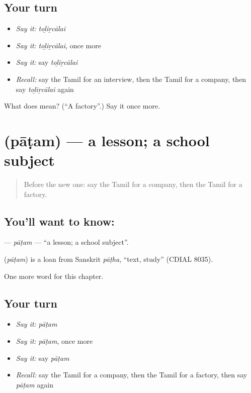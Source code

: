 \subsection*{Your turn}
\begin{itemize}
\raggedright
  \item \emph{Say it:} \emph{toḻiṟcālai}
  \item \emph{Say it:} \emph{toḻiṟcālai}, once more
  \item \emph{Say it:} say \emph{toḻiṟcālai}
  \item \emph{Recall:} say the Tamil for an interview, then the Tamil for a company, then say \emph{toḻiṟcālai} again
\end{itemize}

\begin{tcolorbox}[breakable,colback=teal!4,colframe=teal!35!black,title={Before you move on}]
What does  mean? (\textquotedblleft{}A factory\textquotedblright{}.) Say it once more.
\end{tcolorbox}
\section[\texorpdfstring{\ta{பாடம்} (pāṭam)}{பாடம் (pāṭam)}]{ (pāṭam) — a lesson; a school subject}

\label{lesson:TA-C223-patam}



\begin{quote}
Before the new one: say the Tamil for a company, then the Tamil for a factory.
\end{quote}

\subsection*{You'll want to know: }
\textbf{} — \emph{pāṭam} — \textquotedblleft{}a lesson; a school subject\textquotedblright{}.

\begin{cousinweb}
\textbf{} (\emph{pāṭam}) is a loan from Sanskrit \emph{pāṭha}, \textquotedblleft{}text, study\textquotedblright{} (CDIAL 8035).
\end{cousinweb}

\begin{grammarlens}[title={What you've built}]
One more word for this chapter.
\end{grammarlens}

\subsection*{Your turn}
\begin{itemize}
\raggedright
  \item \emph{Say it:} \emph{pāṭam}
  \item \emph{Say it:} \emph{pāṭam}, once more
  \item \emph{Say it:} say \emph{pāṭam}
  \item \emph{Recall:} say the Tamil for a company, then the Tamil for a factory, then say \emph{pāṭam} again
\end{itemize}

